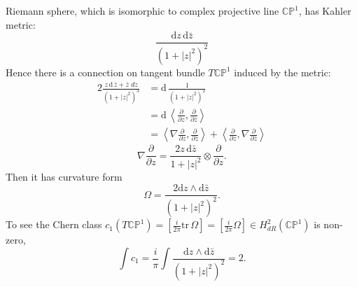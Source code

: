 \documentclass[11pt]{homework}
\theoremstyle{indented}
\begin{document}
\begin{example}
    Riemann sphere, which is isomorphic to complex projective line $\mathbb{CP}^1$, has Kahler metric:
    \begin{equation*}
        \frac{\mathrm d z \, \mathrm d \bar{z}}{\left(1+|z|^2\right)^2}
    \end{equation*}
    Hence there is a connection on tangent bundle $T \mathbb{CP}^1$ induced by the metric:
    \begin{align*}
        2\frac{z \, \mathrm d \, \bar z + \bar z \, \mathrm \, d z}{\left(1+|z|^2\right)^3} &= \mathrm{d}\, \frac{1}{\left(1+|z|^2\right)^2} \\
        &= \mathrm{d}\, \left\langle \frac{\partial}{\partial z}, \frac{\partial}{\partial \bar z} \right\rangle \\
        &= \left\langle \nabla \frac{\partial}{\partial z}, \frac{\partial}{\partial \bar z} \right\rangle + \left\langle \frac{\partial}{\partial z}, \nabla \frac{\partial}{\partial \bar z} \right\rangle
    \end{align*}
    \begin{equation*}
        \nabla \frac{\partial}{\partial z} = \frac{2z \, \mathrm d \bar z}{1+|z|^2} \otimes \frac{\partial}{\partial z}.
    \end{equation*}
    Then it has curvature form 
    \begin{equation*}
        \Omega = \frac{2\mathrm d z \wedge \mathrm d \bar z}{\left(1+|z|^2\right)^2}.
    \end{equation*}
    To see the Chern class $c_1(T \mathbb{CP}^1) = [\frac{i}{2\pi}\mathrm{tr} \,\Omega] = [\frac{i}{2\pi}\Omega] \in H^2_{dR}\left(\mathbb{CP}^1\right)$ is non-zero, 
    \begin{equation*}
        \int c_1 = \frac{i}{\pi} \int \frac{\mathrm d z \wedge \mathrm d \bar z}{\left(1+|z|^2\right)^2} = 2.
    \end{equation*}
\end{example}
\end{document}
